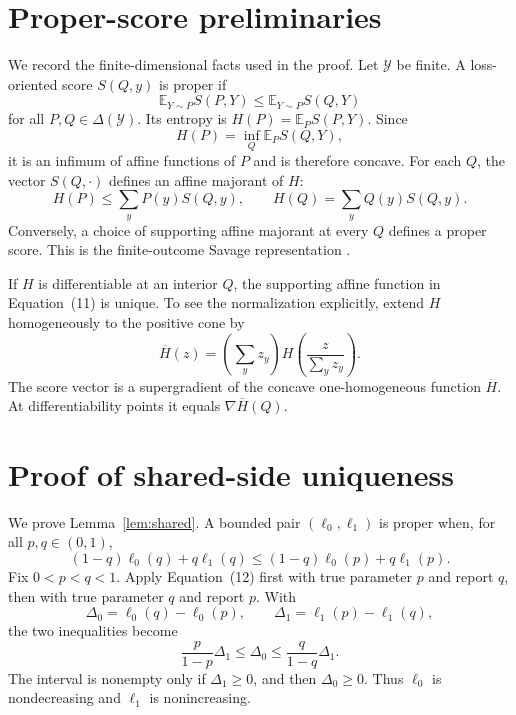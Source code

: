 \documentclass{article}
\theoremstyle{definition}
\theoremstyle{remark}
\newcommand{\E}{\mathbb E}
\newcommand{\1}{\mathbf 1}
\newcommand{\simplex}{\Delta}
\begin{document}



\appendix

\section{Proper-score preliminaries}\label{app:proper}

We record the finite-dimensional facts used in the proof. Let \(\mathcal Y\) be finite. A loss-oriented score \(S(Q,y)\) is proper if \[ \E_{Y\sim P}S(P,Y)\le \E_{Y\sim P}S(Q,Y) \] for all \(P,Q\in\simplex(\mathcal Y)\). Its entropy is \(H(P)=\E_PS(P,Y)\). Since \[ H(P)=\inf_Q\E_PS(Q,Y), \] it is an infimum of affine functions of \(P\) and is therefore concave. For each \(Q\), the vector \(S(Q,\cdot)\) defines an affine majorant of \(H\): \[ H(P)\le \sum_yP(y)S(Q,y), \qquad H(Q)=\sum_yQ(y)S(Q,y). \tag{11} \] Conversely, a choice of supporting affine majorant at every \(Q\) defines a proper score. This is the finite-outcome Savage representation \citep{gneiting2007strictly,dawid2012local}.

If \(H\) is differentiable at an interior \(Q\), the supporting affine function in Equation~(11) is unique. To see the normalization explicitly, extend \(H\) homogeneously to the positive cone by \[ \overline H(z)=\left(\sum_yz_y\right)H\left(\frac{z}{\sum_yz_y}\right). \] The score vector is a supergradient of the concave one-homogeneous function \(\overline H\). At differentiability points it equals \(\nabla\overline H(Q)\).

\section{Proof of shared-side uniqueness}\label{app:shared}

We prove Lemma~\ref{lem:shared}. A bounded pair \((\ell_0,\ell_1)\) is proper when, for all \(p,q\in(0,1)\), \[ (1-q)\ell_0(q)+q\ell_1(q) \le(1-q)\ell_0(p)+q\ell_1(p). \tag{12} \] Fix \(0<p<q<1\). Apply Equation~(12) first with true parameter \(p\) and report \(q\), then with true parameter \(q\) and report \(p\). With \[ \Delta_0=\ell_0(q)-\ell_0(p), \qquad \Delta_1=\ell_1(p)-\ell_1(q), \] the two inequalities become \[ \frac{p}{1-p}\Delta_1\le\Delta_0\le\frac{q}{1-q}\Delta_1. \tag{13} \] The interval is nonempty only if \(\Delta_1\ge0\), and then \(\Delta_0\ge0\). Thus \(\ell_0\) is nondecreasing and \(\ell_1\) is nonincreasing.
\end{document}
